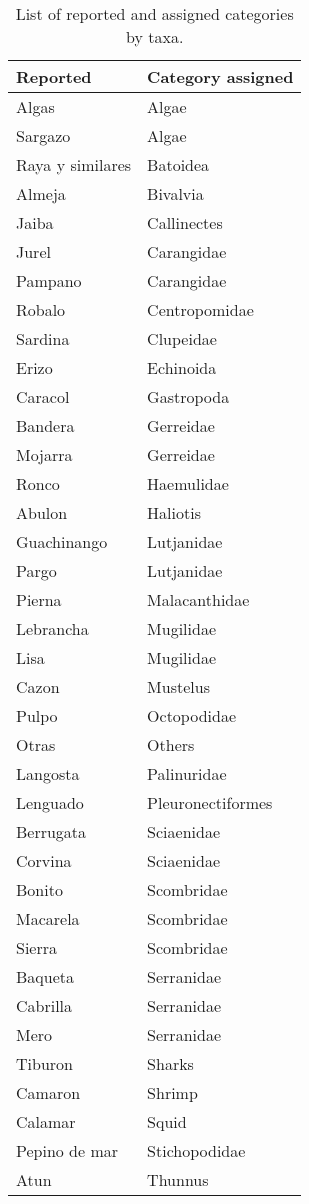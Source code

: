 \begin{table}
\centering
\caption{\label{tab:taxa_table}List of reported and assigned categories by taxa.}
\centering
\begin{tabular}[t]{ll}
\toprule
Reported & Category assigned\\
\midrule
Algas & Algae\\
Sargazo & Algae\\
Raya y similares & Batoidea\\
Almeja & Bivalvia\\
Jaiba & Callinectes\\
Jurel & Carangidae\\
Pampano & Carangidae\\
Robalo & Centropomidae\\
Sardina & Clupeidae\\
Erizo & Echinoida\\
Caracol & Gastropoda\\
Bandera & Gerreidae\\
Mojarra & Gerreidae\\
Ronco & Haemulidae\\
Abulon & Haliotis\\
Guachinango & Lutjanidae\\
Pargo & Lutjanidae\\
Pierna & Malacanthidae\\
Lebrancha & Mugilidae\\
Lisa & Mugilidae\\
Cazon & Mustelus\\
Pulpo & Octopodidae\\
Otras & Others\\
Langosta & Palinuridae\\
Lenguado & Pleuronectiformes\\
Berrugata & Sciaenidae\\
Corvina & Sciaenidae\\
Bonito & Scombridae\\
Macarela & Scombridae\\
Sierra & Scombridae\\
Baqueta & Serranidae\\
Cabrilla & Serranidae\\
Mero & Serranidae\\
Tiburon & Sharks\\
Camaron & Shrimp\\
Calamar & Squid\\
Pepino de mar & Stichopodidae\\
Atun & Thunnus\\
\bottomrule
\end{tabular}
\end{table}

